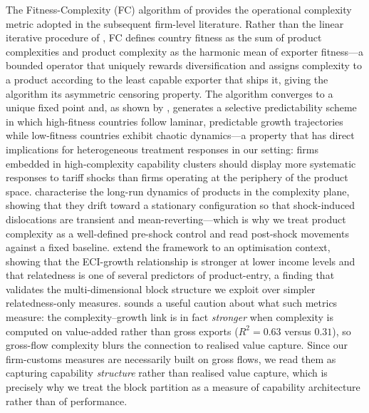 The Fitness-Complexity (FC) algorithm of \citet{cristelli2013} provides the
operational complexity metric adopted in the subsequent firm-level literature. Rather
than the linear iterative procedure of \citet{hidalgo2009}, FC defines country fitness
as the sum of product complexities and product complexity as the harmonic mean of
exporter fitness---a bounded operator that uniquely rewards diversification and
assigns complexity to a product according to the least capable exporter that ships it,
giving the algorithm its asymmetric censoring property. The algorithm converges to a
unique fixed point and, as shown by \citet{cristelli2017}, generates a selective
predictability scheme in which high-fitness countries follow laminar, predictable
growth trajectories while low-fitness countries exhibit chaotic dynamics---a property
that has direct implications for heterogeneous treatment responses in our setting:
firms embedded in high-complexity capability clusters should display more systematic
responses to tariff shocks than firms operating at the periphery of the product
space. \citet{angelini2017} characterise the long-run dynamics of products in the complexity
plane, showing that they drift toward a stationary configuration so that
shock-induced dislocations are transient and mean-reverting---which is why we treat
product complexity as a well-defined pre-shock control and read post-shock movements
against a fixed baseline.
\citet{stojkoski2025} extend the framework to an optimisation context,
showing that the ECI-growth relationship is stronger at lower income levels and that
relatedness is one of several predictors of product-entry, a finding that validates
the multi-dimensional block structure we exploit over simpler relatedness-only
measures. \citet{koch2021} sounds a useful caution about what such metrics measure: the
complexity--growth link is in fact \emph{stronger} when complexity is computed on
value-added rather than gross exports ($R^2 = 0.63$ versus $0.31$), so gross-flow
complexity blurs the connection to realised value capture. Since our firm-customs
measures are necessarily built on gross flows, we read them as capturing capability
\emph{structure} rather than realised value capture, which is precisely why we treat
the block partition as a measure of capability architecture rather than of performance.

